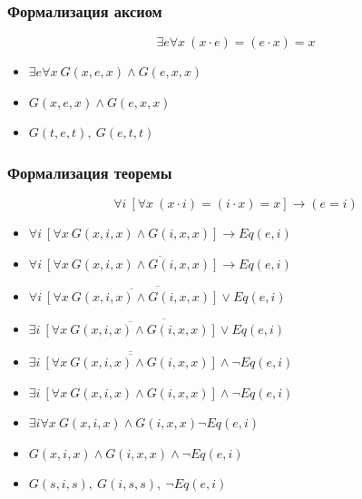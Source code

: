 \documentclass[24pt,pdf,hyperref={unicode},aspectratio=169]{beamer}
\begin{document}
\begin{frame}\frametitle{Формализация аксиом}
$$
\exists e\forall x\ (x\cdot e)=(e\cdot x)=x
$$
\begin{itemize}
\item<+-> $\exists e\forall x\ G(x,e,x)\wedge G(e,x,x)$
\item<+-> $G(x,e,x)\wedge G(e,x,x)$
\item<+-> $G(t,e,t),\ G(e,t,t)$
\end{itemize}
\end{frame}

\begin{frame}\frametitle{Формализация теоремы}
$$
\forall i\ \left[\forall x\ (x\cdot i)=(i\cdot x)=x\right]\rightarrow (e=i)
$$
\begin{itemize}
\item<+-> $\forall i\ \left[\forall x\ G(x,i,x)\wedge G(i,x,x) \right]\rightarrow Eq(e,i)$
\item<+-> $\overline{\forall i\ \left[\forall x\ G(x,i,x)\wedge G(i,x,x) \right]\rightarrow Eq(e,i)}$
\item<+-> $\overline{\forall i\ \overline{\left[\forall x\ G(x,i,x)\wedge G(i,x,x) \right]}\vee Eq(e,i)}$
\item<+-> $\exists i\ \overline{\overline{\left[\forall x\ G(x,i,x)\wedge G(i,x,x) \right]}\vee Eq(e,i)}$
\item<+-> $\exists i\ \overline{\overline{\left[\forall x\ G(x,i,x)\wedge G(i,x,x) \right]}}\wedge \neg Eq(e,i)$
\item<+-> $\exists i\ \left[\forall x\ G(x,i,x)\wedge G(i,x,x) \right]\wedge \neg Eq(e,i)$
\item<+-> $\exists i\forall x\  G(x,i,x)\wedge G(i,x,x) \neg Eq(e,i)$
\item<+-> $G(x,i,x)\wedge G(i,x,x) \wedge \neg Eq(e,i)$
\item<+-> $G(s,i,s),\ G(i,s,s),\ \neg Eq(e,i)$
\end{itemize}
\end{frame}
\end{document}
